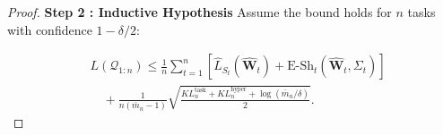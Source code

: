 \documentclass[letterpaper]{article} %
\begin{document}
\begin{proof}







\textbf{Step 2 : Inductive Hypothesis} 
Assume the bound holds for $n$ tasks with confidence $1-\delta/2$:

\begin{equation}
\begin{aligned}
    &L(\mathcal{Q}_{1:n}) \le \frac{1}{n} \sum_{t=1}^n \left[ \widehat{L}_{S_t}(\hat{\mathbf{W}}_t) + \mathrm{E\text{-}Sh}_t(\hat{\mathbf{W}}_t, \Sigma_t) \right]  \\
    &\quad + \frac{1}{n(\bar{m}_n - 1)} \sqrt{\frac{KL^{\text{task}}_n + KL^{\text{hyper}}_n + \log(\bar{m}_n/\delta)}{2}}.
\end{aligned} 
\label{eq:com1}
\end{equation}


\end{proof}
\end{document}
